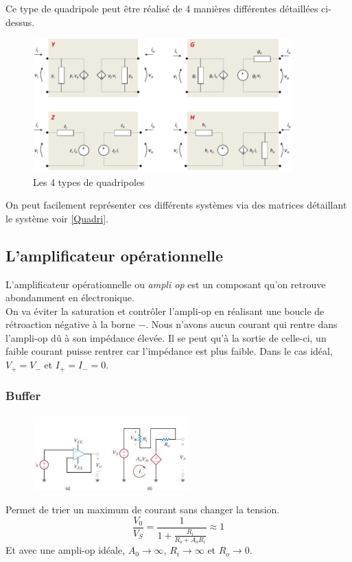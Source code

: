 \documentclass{report}
\begin{document}
Ce type de quadripole peut être réalisé de 4 manières différentes détaillées ci-dessus.
\begin{figure}[H]
\centering
\includegraphics[width=10cm]{img/YZGH.png}
\caption{Les 4 types de quadripoles}
\end{figure}
On peut facilement représenter ces différents systèmes via des matrices détaillant le système voir \ref{Quadri}.

\subsection{L'amplificateur opérationnelle}
L'amplificateur opérationnelle ou \textit{ampli op} est un composant qu'on retrouve abondamment en électronique.\\
On va éviter la saturation et contrôler l'ampli-op en réalisant une boucle de rétroaction négative à la borne $-$. Nous n'avons aucun courant qui rentre dans l'ampli-op dû à son impédance élevée. Il se peut qu'à la sortie de celle-ci, un faible courant puisse rentrer car l'impédance est plus faible. Dans le cas idéal, $V_+ = V_-$ et $I_+ = I_- = 0$.

\subsubsection{Buffer}
\begin{figure}[H]
\centering
\includegraphics[width=6cm]{img/buffer.png}
\end{figure}
Permet de trier un maximum de courant sans changer la tension.
\begin{equation}
\frac{V_0}{V_S} = \frac{1}{1 + \frac{R_i}{R_o + A_o R_i}} \approx 1
\end{equation}
Et avec une ampli-op idéale, $A_0 \rightarrow \infty$, $R_i \rightarrow \infty$ et $R_o \rightarrow 0$.
\end{document}
